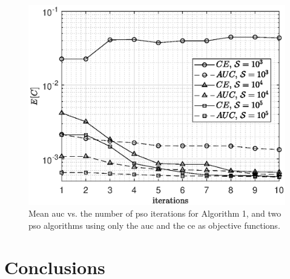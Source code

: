 \documentclass[conference,final]{IEEEtran}
\begin{document}
 
\begin{figure} 
    \centering
    \includegraphics[width=1\columnwidth]{res_PSO_comp.eps}
    \caption{Mean \ac{auc} vs. the number of \ac{pso} iterations for Algorithm 1, and two \ac{pso} algorithms using only the  \ac{auc} and the \ac{ce} as objective functions. }
    \label{fig:CEvsAUC}
\end{figure}

 
\section{Conclusions}
\label{sec:conc}
\end{document}
